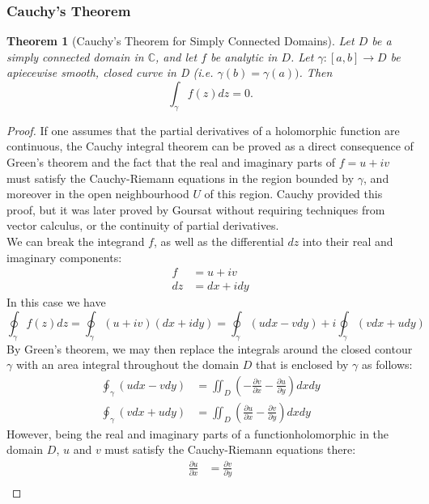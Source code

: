 \documentclass{article}
\newtheorem{theorem}{Theorem}[section]
\begin{document}
\subsubsection{Cauchy's Theorem}
\begin{theorem}[Cauchy's Theorem for Simply Connected Domains]
Let $D$ be a simply connected domain in $\mathbb{C}$, and let $f$ be analytic in $D$. Let $\gamma : [a, b] \to D$ be apiecewise smooth, closed curve in D (i.e. $\gamma(b) = \gamma(a))$. Then
\begin{equation*}
\int_{\gamma}f(z)dz = 0.
\end{equation*}
\end{theorem}
\begin{proof}
If one assumes that the partial derivatives of a holomorphic function are continuous, the Cauchy integral theorem can be proved as a direct consequence of Green's theorem and the fact that the real and imaginary parts of $f = u + iv$ must satisfy the Cauchy-Riemann equations in the region bounded by $\gamma$, and moreover in the open neighbourhood $U$ of this region. Cauchy provided this proof, but it was later proved by Goursat without requiring techniques from vector calculus, or the continuity of partial derivatives.\\
We can break the integrand $f$, as well as the differential $dz$ into their real and imaginary components:
\begin{align*}
f &= u + iv \\
dz &= dx + i dy
\end{align*}
In this case we have
\begin{equation*}
\oint_{\gamma}f(z)dz = \oint_{\gamma}(u + iv)(dx + i dy) = \oint_{\gamma} (u dx - v dy) + i\oint_{\gamma} (v dx + u dy)
\end{equation*}
By Green's theorem, we may then replace the integrals around the closed contour $\gamma$ with an area integral throughout the domain $D$ that is enclosed by $\gamma$ as follows:
\begin{align*}
\oint_{\gamma} (u dx - v dy) &= \iint_D (-\frac{\partial v}{\partial x} - \frac{\partial u}{\partial y}) dx dy \\
\oint_{\gamma} (v dx + u dy) &= \iint_D (\frac{\partial u}{\partial x} - \frac{\partial v}{\partial y}) dx dy
\end{align*}
However, being the real and imaginary parts of a functionholomorphic in the domain $D$, $u$ and $v$ must satisfy the Cauchy-Riemann equations there:
\begin{align*}
\frac{\partial u}{\partial x} &= \frac{\partial v}{\partial y}\\

\end{align*}
\end{proof}
\end{document}
